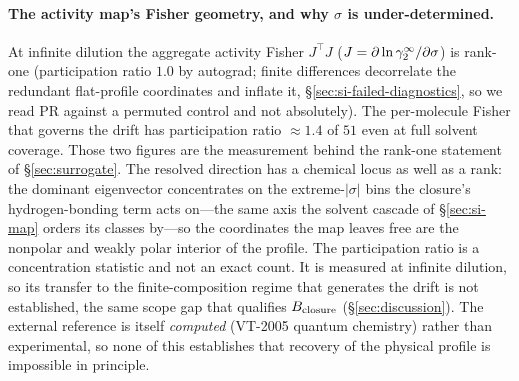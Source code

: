 \paragraph{The activity map's Fisher geometry, and why $\sigma$ is under-determined.}
\label{par:fisher-geometry}
At infinite
dilution the aggregate activity Fisher $J^{\top}J$ ($J=\partial\ln\gamma_2^\infty/\partial\sigma$) is rank-one
(participation ratio $1.0$ by autograd; finite differences decorrelate the redundant flat-profile
coordinates and inflate it, \S\ref{sec:si-failed-diagnostics}, so we read $\mathrm{PR}$ against a
permuted control and not absolutely). The per-molecule Fisher that governs the drift has
participation ratio ${\approx}1.4$ of $51$ even at full solvent coverage. Those two figures are the
measurement behind the rank-one statement of \S\ref{sec:surrogate}. The resolved
direction has a chemical locus as well as a rank: the dominant eigenvector concentrates on the
extreme-$|\sigma|$ bins the closure's hydrogen-bonding term acts on---the same axis the solvent
cascade of \S\ref{sec:si-map} orders its classes by---so the coordinates the map leaves free are the
nonpolar and weakly polar interior of the profile. The participation ratio is
a concentration statistic and not an exact count. It is measured at infinite dilution, so its transfer
to the finite-composition regime that generates the drift is not established, the same scope gap that
qualifies $B_{\mathrm{closure}}$ (\S\ref{sec:discussion}). The external reference is itself \emph{computed}
(VT-2005 quantum chemistry) rather than experimental, so none of this establishes that recovery of
the physical profile is impossible in principle.
